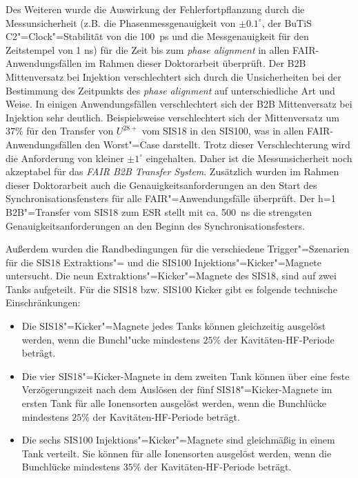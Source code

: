 Des Weiteren wurde die Auswirkung der Fehlerfortpflanzung durch die Messunsicherheit (z.B. die Phasenmessgenauigkeit von $\pm 0.1^\circ$, der BuTiS C2"=Clock"=Stabilit\"at von die \SI{100}{ps} und die Messgenauigkeit für den Zeitstempel von 1 ns) f\"ur die Zeit bis zum \textit{phase alignment} in allen FAIR-Anwendungsf\"allen im Rahmen dieser Doktorarbeit überpr\"uft. Der B2B Mittenversatz bei Injektion verschlechtert sich durch die Unsicherheiten bei der Bestimmung des Zeitpunkts des \textit{phase alignment} auf unterschiedliche Art und Weise. In einigen Anwendungsfällen verschlechtert sich der B2B Mittenversatz bei Injektion sehr deutlich. Beispielsweise verschlechtert sich der Mittenversatz um $37\%$ f\"ur den Transfer von $U^\mathit{28+}$  vom SIS18 in den SIS100, was in allen FAIR-Anwendungsf\"allen den Worst"=Case darstellt. Trotz dieser Verschlechterung wird die Anforderung von kleiner $\pm1^\circ$ eingehalten. Daher ist die Messunsicherheit noch akzeptabel für das \textit{FAIR B2B Transfer System}. Zus\"atzlich wurden im Rahmen dieser Doktorarbeit auch die Genauigkeitsanforderungen an den Start des Synchronisationsfensters f\"ur alle FAIR"=Anwendungsf\"alle \"uberpr\"uft. Der h=1 B2B"=Transfer vom SIS18 zum ESR stellt mit ca. \SI{500}{\ns} die strengsten Genauigkeitsanforderungen an den Beginn des Synchronisationsfesters. 

Au\ss{}erdem wurden die Randbedingungen f\"ur die verschiedene Trigger"=Szenarien f\"ur die SIS18 Extraktions"= und die SIS100 Injektions"=Kicker"=Magnete untersucht. Die neun Extraktions"=Kicker"=Magnete des SIS18, sind auf zwei Tanks aufgeteilt. Für die SIS18 bzw. SIS100 Kicker gibt es folgende technische Einschränkungen: 
\begin{itemize}
\item Die SIS18"=Kicker"=Magnete jedes Tanks k\"onnen gleichzeitig ausgelöst werden, wenn die Bunchl"ucke mindestens $25\%$ der Kavit\"aten-HF-Periode beträgt. 
\item Die vier SIS18"=Kicker-Magnete in dem zweiten Tank k\"onnen \"uber eine feste Verz\"ogerungszeit nach dem Ausl\"osen der f\"unf SIS18"=Kicker-Magnete im ersten Tank f\"ur alle Ionensorten ausgel\"ost werden, wenn die Bunchl\"ucke mindestens $25\%$ der Kavit\"aten-HF-Periode betr\"agt. 
\item Die sechs SIS100 Injektions"=Kicker"=Magnete sind gleichm\"a\ss{}ig in einem Tank verteilt. Sie k\"onnen f\"ur alle Ionensorten ausgel\"ost werden, wenn die Bunchl\"ucke mindestens $35\%$ der Kavitäten-HF-Periode betr\"agt.  
\end{itemize}

